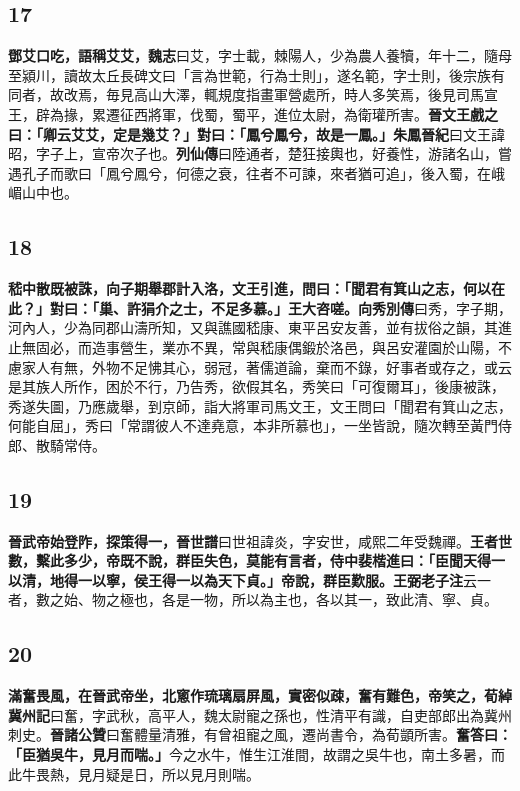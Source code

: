 \subsection*{17}

\textbf{鄧艾口吃，語稱艾艾，}{\footnotesize \textbf{魏志}曰艾，字士載，棘陽人，少為農人養犢，年十二，隨母至潁川，讀故太丘長碑文曰「言為世範，行為士則」，遂名範，字士則，後宗族有同者，故改焉，毎見高山大澤，輒規度指畫軍營處所，時人多笑焉，後見司馬宣王，辟為掾，累遷征西將軍，伐蜀，蜀平，進位太尉，為衛瓘所害。}\textbf{晉文王戲之曰：「卿云艾艾，定是幾艾？」對曰：「鳳兮鳳兮，故是一鳳。」}{\footnotesize \textbf{朱鳳晉紀}曰文王諱昭，字子上，宣帝次子也。\textbf{列仙傳}曰陸通者，楚狂接輿也，好養性，游諸名山，嘗遇孔子而歌曰「鳳兮鳳兮，何德之衰，往者不可諫，來者猶可追」，後入蜀，在峨嵋山中也。}

\subsection*{18}

\textbf{嵇中散既被誅，向子期舉郡計入洛，文王引進，問曰：「聞君有箕山之志，何以在此？」對曰：「巢、許狷介之士，不足多慕。」王大咨嗟。}{\footnotesize \textbf{向秀別傳}曰秀，字子期，河內人，少為同郡山濤所知，又與譙國嵇康、東平呂安友善，並有拔俗之韻，其進止無固必，而造事營生，業亦不異，常與嵇康偶鍛於洛邑，與呂安灌園於山陽，不慮家人有無，外物不足怫其心，弱冠，著儒道論，棄而不錄，好事者或存之，或云是其族人所作，困於不行，乃告秀，欲假其名，秀笑曰「可復爾耳」，後康被誅，秀遂失圖，乃應歲舉，到京師，詣大將軍司馬文王，文王問曰「聞君有箕山之志，何能自屈」，秀曰「常謂彼人不達堯意，本非所慕也」，一坐皆說，隨次轉至黃門侍郎、散騎常侍。}

\subsection*{19}

\textbf{晉武帝始登阼，探策得一，}{\footnotesize \textbf{晉世譜}曰世祖諱炎，字安世，咸熙二年受魏禪。}\textbf{王者世數，繫此多少，帝既不說，群臣失色，莫能有言者，侍中裴楷進曰：「臣聞天得一以清，地得一以寧，侯王得一以為天下貞。」帝說，群臣歎服。}{\footnotesize \textbf{王弼老子注}云一者，數之始、物之極也，各是一物，所以為主也，各以其一，致此清、寧、貞。}

\subsection*{20}

\textbf{滿奮畏風，在晉武帝坐，北窻作琉璃扇屏風，實密似疎，奮有難色，帝笑之，}{\footnotesize \textbf{荀綽冀州記}曰奮，字武秋，高平人，魏太尉寵之孫也，性清平有識，自吏部郎出為冀州刺史。\textbf{晉諸公贊}曰奮體量清雅，有曾祖寵之風，遷尚書令，為荀顗所害。}\textbf{奮答曰：「臣猶吳牛，見月而喘。」}{\footnotesize 今之水牛，惟生江淮間，故謂之吳牛也，南土多暑，而此牛畏熱，見月疑是日，所以見月則喘。}

